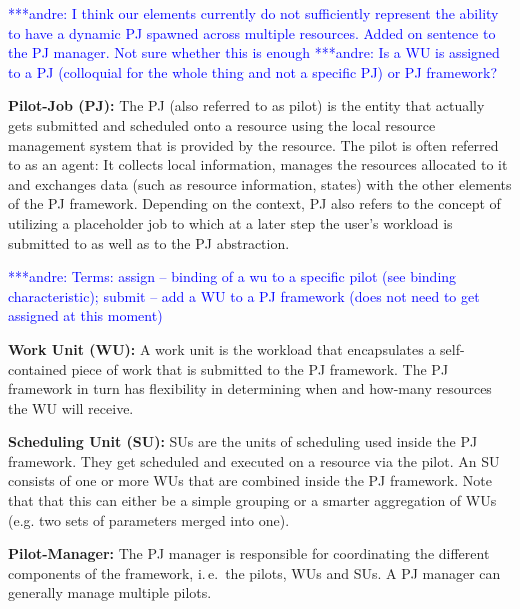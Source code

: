 \documentclass[conference,final]{IEEEtran}
\newcommand{\jhanote}[1]{ {\textcolor{red} { ***shantenu: #1 }}}
\newcommand{\alnote}[1]{ {\textcolor{blue} { ***andre: #1 }}}
\newcommand{\alnote}[1]{}
\newcommand{\jhanote}[1]{}
\begin{document}
\alnote{I think our elements currently do not sufficiently represent the ability 
to have a dynamic PJ spawned across multiple resources. Added on sentence to the PJ manager. Not sure whether this is enough}
\alnote{Is a WU is assigned to a PJ (colloquial for the whole thing and not a specific PJ) or PJ framework?}
\begin{compactitem}
\item \textbf{Pilot-Job (PJ):} The PJ (also referred to as pilot) is the entity
that actually gets submitted and scheduled onto a resource using the local
resource management system that is provided by the resource. The pilot is often
referred to as an agent: It collects local information, manages the resources
allocated to it and exchanges data (such as resource information, states) with
the other elements of the PJ framework. Depending on the context, PJ also refers
to the concept of utilizing a placeholder job to which at a later step the
user's workload is submitted to as well as to the PJ abstraction.

\alnote{Terms: assign -- binding of a wu to a specific pilot (see binding
characteristic); submit -- add a WU to a PJ framework (does not need to get
assigned at this moment)}
\item \textbf{Work Unit (WU):} A work unit is the workload that encapsulates a
self-contained piece of work that is submitted to the PJ framework. The PJ
framework in turn has flexibility in determining when and how-many resources the
WU will receive.

\item \textbf{Scheduling Unit (SU):} SUs are the units of scheduling used inside the PJ framework. They get scheduled and
executed on a resource via the pilot. An SU consists of one or more WUs that are
combined inside the PJ framework. Note that that this can either be a simple
grouping or a smarter aggregation of WUs (e.g. two sets of parameters merged
into one).
  


\item \textbf{Pilot-Manager:} The PJ manager is responsible for coordinating
	  the different components of the framework, i.\,e.\ the pilots, WUs and 
	  SUs. A PJ manager can generally manage multiple pilots.
\end{compactitem}
\end{document}

